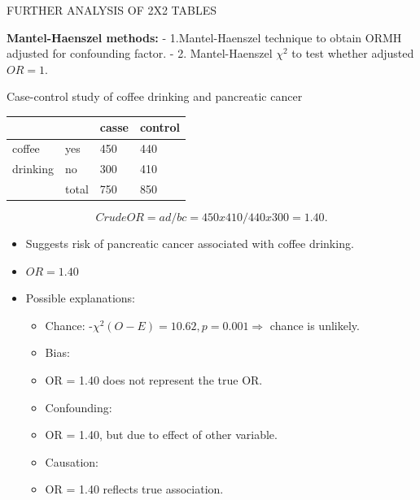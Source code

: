 \documentclass[ignorenonframetext,]{beamer}
\begin{document}
\begin{frame}{FURTHER ANALYSIS OF 2X2 TABLES}

\textbf{Mantel-Haenszel methods:} - 1.Mantel-Haenszel technique to
obtain ORMH adjusted for confounding factor. - 2. Mantel-Haenszel
\(\chi^2\) to test whether adjusted \(OR = 1.\)

\end{frame}

\begin{frame}{Case-control study of coffee drinking and pancreatic
cancer}

\begin{longtable}[c]{@{}llll@{}}
\toprule
& & casse & control\tabularnewline
\midrule
\endhead
coffee & yes & 450 & 440\tabularnewline
drinking & no & 300 & 410\tabularnewline
& total & 750 & 850\tabularnewline
\bottomrule
\end{longtable}

\[
Crude OR = ad / bc = 450x410 / 440x300 = 1.40.
\]

\begin{itemize}
\itemsep1pt\parskip0pt
\item
  Suggests risk of pancreatic cancer associated with coffee drinking.
\end{itemize}

\end{frame}

\begin{frame}

\begin{itemize}
\item
  \(OR=1.40\)
\item
  Possible explanations:

  \begin{itemize}
  \itemsep1pt\parskip0pt
  \item
    Chance: -\(\chi^2 (O-E) = 10.62, p=0.001 \Rightarrow\) chance is
    unlikely.
  \item
    Bias:
  \item
    OR = 1.40 does not represent the true OR.
  \item
    Confounding:
  \item
    OR = 1.40, but due to effect of other variable.
  \item
    Causation:
  \item
    OR = 1.40 reflects true association.
  \end{itemize}
\end{itemize}

\end{frame}
\end{document}
